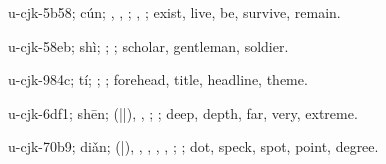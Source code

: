 \begin{multicols}{2}
{\cjkgGlue{}u-cjk-5b58; cún; \cjkgGlue{}, \cjkgGlue{}, \cjkgGlue{}; \cjkgGlue{}, \cjkgGlue{}; exist, live, be, survive, remain.

\cjkgGlue{}u-cjk-58eb; shì; \cjkgGlue{}; \cjkgGlue{}; scholar, gentleman, soldier.

\cjkgGlue{}u-cjk-984c; tí; \cjkgGlue{}; \cjkgGlue{}; forehead, title, headline, theme.

\cjkgGlue{}u-cjk-6df1; shēn; \cjkgGlue{}\cjkgGlue{}(\cjkgGlue{}|\cjkgGlue{}|\cjkgGlue{}), \cjkgGlue{}\cjkgGlue{}\cjkgGlue{}, \cjkgGlue{}; \cjkgGlue{}; deep, depth, far, very, extreme.

\cjkgGlue{}u-cjk-70b9; diǎn; \cjkgGlue{}\cjkgGlue{}(\cjkgGlue{}|\cjkgGlue{}), \cjkgGlue{}\cjkgGlue{}\cjkgGlue{}, \cjkgGlue{}\cjkgGlue{}\cjkgGlue{}, \cjkgGlue{}\cjkgGlue{}\cjkgGlue{}, \cjkgGlue{}\cjkgGlue{}\cjkgGlue{}, \cjkgGlue{}; \cjkgGlue{}; dot, speck, spot, point, degree.

}
\end{multicols}
